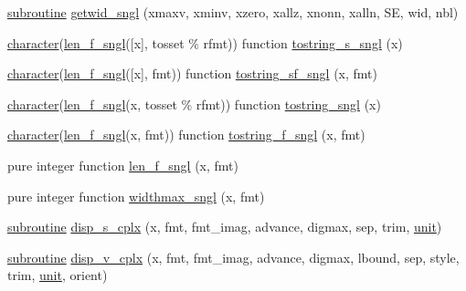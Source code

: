 \begin{DoxyCompactItemize}
\item 
\hyperlink{M__stopwatch_83_8txt_acfbcff50169d691ff02d4a123ed70482}{subroutine} \hyperlink{namespacem__display_a033e94ba8986246bbf567046e8678163}{getwid\+\_\+sngl} (xmaxv, xminv, xzero, xallz, xnonn, xalln, SE, wid, nbl)
\item 
\hyperlink{option__stopwatch_83_8txt_abd4b21fbbd175834027b5224bfe97e66}{character}(\hyperlink{namespacem__display_ae0feb946fbc4c31f8ba53e20719fa508}{len\+\_\+f\+\_\+sngl}(\mbox{[}x\mbox{]}, tosset \% rfmt)) function \hyperlink{namespacem__display_a05b3cac8d4c04e08dc99c7c23f1254ba}{tostring\+\_\+s\+\_\+sngl} (x)
\item 
\hyperlink{option__stopwatch_83_8txt_abd4b21fbbd175834027b5224bfe97e66}{character}(\hyperlink{namespacem__display_ae0feb946fbc4c31f8ba53e20719fa508}{len\+\_\+f\+\_\+sngl}(\mbox{[}x\mbox{]}, fmt)) function \hyperlink{namespacem__display_a7767d9921f1509c55b3cae0cb7ba69b4}{tostring\+\_\+sf\+\_\+sngl} (x, fmt)
\item 
\hyperlink{option__stopwatch_83_8txt_abd4b21fbbd175834027b5224bfe97e66}{character}(\hyperlink{namespacem__display_ae0feb946fbc4c31f8ba53e20719fa508}{len\+\_\+f\+\_\+sngl}(x, tosset \% rfmt)) function \hyperlink{namespacem__display_a369e3db088c0732554bd00dac6ce628d}{tostring\+\_\+sngl} (x)
\item 
\hyperlink{option__stopwatch_83_8txt_abd4b21fbbd175834027b5224bfe97e66}{character}(\hyperlink{namespacem__display_ae0feb946fbc4c31f8ba53e20719fa508}{len\+\_\+f\+\_\+sngl}(x, fmt)) function \hyperlink{namespacem__display_a3c751ef3422139ca7190d5b0d64638a8}{tostring\+\_\+f\+\_\+sngl} (x, fmt)
\item 
pure integer function \hyperlink{namespacem__display_ae0feb946fbc4c31f8ba53e20719fa508}{len\+\_\+f\+\_\+sngl} (x, fmt)
\item 
pure integer function \hyperlink{namespacem__display_a3bb36db16c84ea38d1697191adbc027a}{widthmax\+\_\+sngl} (x, fmt)
\item 
\hyperlink{M__stopwatch_83_8txt_acfbcff50169d691ff02d4a123ed70482}{subroutine} \hyperlink{namespacem__display_a2d8cd9c698ef035111fdc53524abe523}{disp\+\_\+s\+\_\+cplx} (x, fmt, fmt\+\_\+imag, advance, digmax, sep, trim, \hyperlink{M__stopwatch_83_8txt_a5cbef30eb7c0d734bd82f5a7ebea9aa7}{unit})
\item 
\hyperlink{M__stopwatch_83_8txt_acfbcff50169d691ff02d4a123ed70482}{subroutine} \hyperlink{namespacem__display_a37cf49f7db41c24a8f363474283909d6}{disp\+\_\+v\+\_\+cplx} (x, fmt, fmt\+\_\+imag, advance, digmax, lbound, sep, style, trim, \hyperlink{M__stopwatch_83_8txt_a5cbef30eb7c0d734bd82f5a7ebea9aa7}{unit}, orient)

\end{DoxyCompactItemize}

